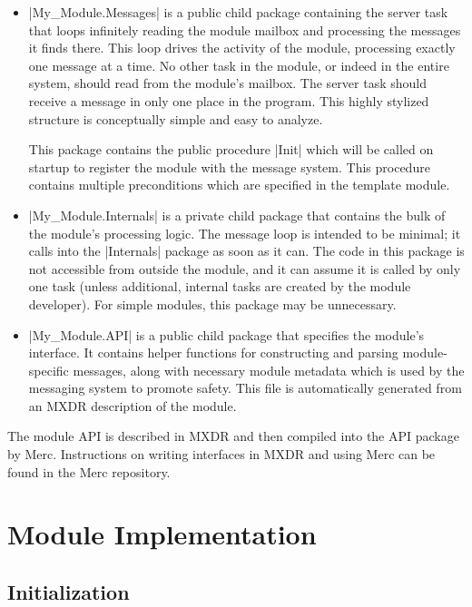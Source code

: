 \begin{itemize}
\item |My_Module.Messages| is a public child package containing the server task that loops
  infinitely reading the module mailbox and processing the messages it finds there. This loop
  drives the activity of the module, processing exactly one message at a time. No other task in
  the module, or indeed in the entire system, should read from the module's mailbox. The server
  task should receive a message in only one place in the program. This highly stylized structure
  is conceptually simple and easy to analyze.

  This package contains the public procedure |Init| which will be called on startup to register
  the module with the message system. This procedure contains multiple preconditions which are
  specified in the template module.

\item |My_Module.Internals| is a private child package that contains the bulk of the module's
  processing logic. The message loop is intended to be minimal; it calls into the |Internals|
  package as soon as it can. The code in this package is not accessible from outside the module,
  and it can assume it is called by only one task (unless additional, internal tasks are created
  by the module developer). For simple modules, this package may be unnecessary.

\item |My_Module.API| is a public child package that specifies the module's interface. It
  contains helper functions for constructing and parsing module-specific messages, along with
  necessary module metadata which is used by the messaging system to promote safety. This file
  is automatically generated from an MXDR description of the module.
\end{itemize}

The module API is described in MXDR and then compiled into the API package by Merc.
Instructions on writing interfaces in MXDR and using Merc can be found in the Merc repository.

\section{Module Implementation}
\label{sec:module-implementation}

\subsection{Initialization}

